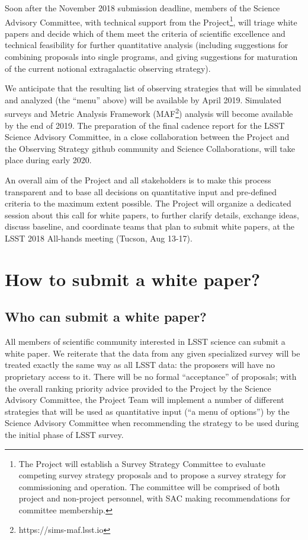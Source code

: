 \documentclass[DM,lsstdraft,toc,usenatbib]{lsstdoc}
\begin{document}
Soon after the November 2018 submission deadline, members of the Science Advisory 
Committee, with technical support from the Project\footnote{The Project will establish a Survey 
Strategy Committee to evaluate competing survey strategy proposals and to propose a survey 
strategy for commissioning and operation. The committee will be comprised of both project and 
non-project personnel, with SAC making recommendations for committee membership.}, will 
triage white papers and decide which of them meet the criteria of scientific excellence and 
technical feasibility for further quantitative analysis (including suggestions for combining 
proposals into single programs, and giving suggestions for maturation of the current notional 
extragalactic observing strategy). 

We anticipate that the resulting list of observing strategies that will be simulated and analyzed 
(the ``menu'' above) will be available by April 2019. Simulated surveys and Metric Analysis 
Framework (MAF\footnote{https://sims-maf.lsst.io}) analysis will become available by the end 
of 2019. The preparation of the final cadence report for the LSST Science Advisory Committee, 
in a close collaboration between the Project and the Observing Strategy github community and 
Science Collaborations, will take place during early 2020.  

An overall aim of the Project and all stakeholders is to make this process transparent and to base 
all decisions on quantitative input and pre-defined criteria to the maximum extent possible. 
The Project will organize a dedicated session about this call for white papers, to further clarify 
details, exchange ideas, discuss baseline, and coordinate teams that plan to submit white papers,
at the LSST 2018 All-hands meeting (Tucson, Aug 13-17). 


\section{How to submit a white paper?} 


\subsection{Who can submit a white paper?} 

All members of scientific community interested in LSST science can submit a white paper. 
We reiterate that the data from any given specialized survey will be treated exactly the same 
way as all LSST data: the proposers will have no proprietary access to it. There will be no 
formal ``acceptance'' of proposals; with the overall ranking priority advice provided to the 
Project by the Science Advisory Committee, the Project Team will implement a number of
different strategies that will be used as quantitative input (``a menu of options'') by the 
Science Advisory Committee when recommending the strategy to be used during the initial 
phase of LSST survey. 
\end{document}
